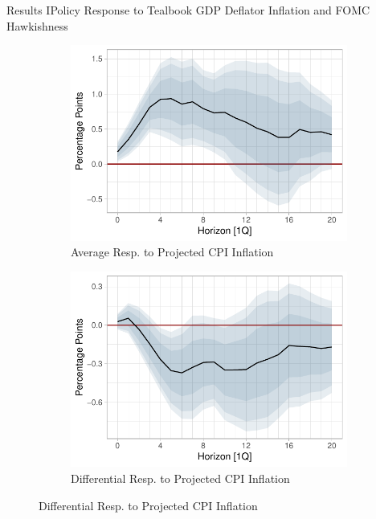 \documentclass[11pt,pdf,aspectratio=129]{beamer}
\begin{document}
\begin{frame}{Results I}{Policy Response to Tealbook GDP Deflator Inflation and FOMC Hawkishness}


    \begin{figure}[!htbp]\centering
        \begin{minipage}{.9\textwidth}
          \caption{Policy Response to Inflation and FOMC Hawkishness. Short Specification}\vspace{1ex}
          \label{fig:LP_short}
          \begin{subfigure}[b]{0.495\textwidth}
              \centering
              \caption{Average Resp. to Projected CPI Inflation}
              \label{fig:LP_short:average_inflation}
              \includegraphics[width=\linewidth]{average_cpi_inflation_short.pdf}
          \end{subfigure}
          \hfill
          \begin{subfigure}[b]{0.495\textwidth}
              \centering
              \caption{Differential  Resp. to Projected CPI Inflation}
              \label{fig:LP_short:differential_inflation}
              \includegraphics[width=\linewidth]{differential_cpi_inflation_short.pdf}

\end{subfigure}
\end{minipage}
\end{figure}
\end{frame}
\end{document}
